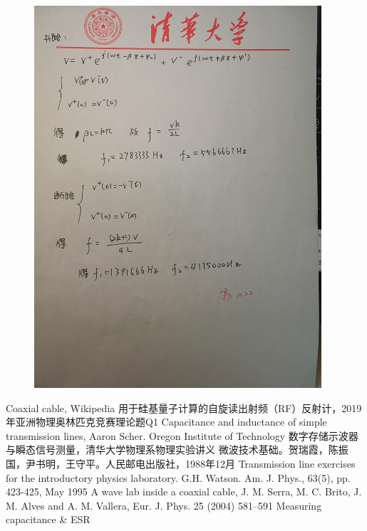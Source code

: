 \documentclass[UTF8]{ctexart}
\begin{document}
\begin{figure}[H]
\centering
\includegraphics[width=0.95\textwidth]{A4.jpg}
\end{figure}
\begin{thebibliography}{123456} 
Coaxial cable, Wikipedia
用于硅基量子计算的自旋读出射频（RF）反射计，2019年亚洲物理奥林匹克竞赛理论题Q1
Capacitance and inductance of simple transmission lines, Aaron Scher. Oregon Institute of Technology
数字存储示波器与瞬态信号测量，清华大学物理系物理实验讲义
微波技术基础。贺瑞霞，陈振国，尹书明，王守平。人民邮电出版社，1988年12月
Transmission line exercises for the introductory physics laboratory. G.H. Watson. Am. J. Phys., 63(5), pp. 423-425, May 1995
A wave lab inside a coaxial cable, J. M. Serra, M. C. Brito, J. M. Alves and A. M. Vallera, Eur. J. Phys. 25 (2004) 581–591
Measuring capacitance \& ESR
\end{thebibliography}
\end{document}
